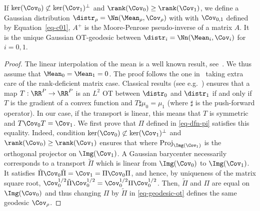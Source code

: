 \begin{proposition}\label{prop-geod-gaussian} 
If $\ker(\Cov_0) \not\subset \ker(\Cov_1)^\bot$ and $\rank(\Cov_0) \geq \rank(\Cov_1)$, we define a Gaussian distribution $\distr_\rho = \Nn(\Mean_\rho,\Cov_\rho)$ with
with $\Cov_{0,1}$ defined by Equation~\eqref{eq-c01}, $A^+$ is the Moore-Penrose pseudo-inverse of a matrix $A$. It is the unique Gaussian OT-geodesic between $\distr_i=\Nn(\Mean_i,\Cov_i)$ for $i=0,1$.
\end{proposition}

\begin{proof}
	The linear interpolation of the mean is a well known result, see~\cite{villani-topics}. We thus assume that $\Mean_0=\Mean_1=0$.
	The proof follows the one in~\cite{takatsu-wasserstein-gaussian} taking extra care of the rank-deficient matrix case. Classical results (see e.g.~\cite{villani-topics}) ensures that a map $T : \RR^{P} \rightarrow \RR^P$ is an $L^2$ OT between $\distr_0$ and $\distr_1$ if and only if $T$ is the gradient of a convex function and $T \sharp \mu_0 = \mu_1$ (where $\sharp$ is the push-forward operator). In our case, if the transport is linear, this means that $T$ is symmetric and $T \Cov_0 T = \Cov_1$. We first prove that $\Pi$ defined in \eqref{eq-dfn-pi} satisfies this equality. Indeed, condition $\ker(\Cov_0) \not\subset \ker(\Cov_1)^\bot$ and $\rank(\Cov_0) \geq \rank(\Cov_1)$ ensures that 
	where $\text{Proj}_{\Img(\Cov_1)}$ is the orthogonal projector on $\Img(\Cov_1)$.
	A Gaussian barycenter necessarily corresponds to a transport $\tilde \Pi$ which is linear
	from $\Img(\Cov_0)$ to $\Img(\Cov_1)$. 
	It satisfies $\tilde \Pi \Cov_0 \tilde \Pi = \Cov_1 = \Pi \Cov_0 \Pi$, and hence, 
	by uniqueness of the matrix square root, $\Cov_0^{1/2} \tilde\Pi \Cov_0^{1/2} = \Cov_0^{1/2} \Pi \Cov_0^{1/2}$. Then, $\tilde \Pi$ and $\Pi$ are equal on $\Img(\Cov_0)$ and thus changing $\Pi$ by $\tilde \Pi$ in \eqref{eq-geodesic-ot} defines the same geodesic $\Cov_\rho$.
\end{proof}

